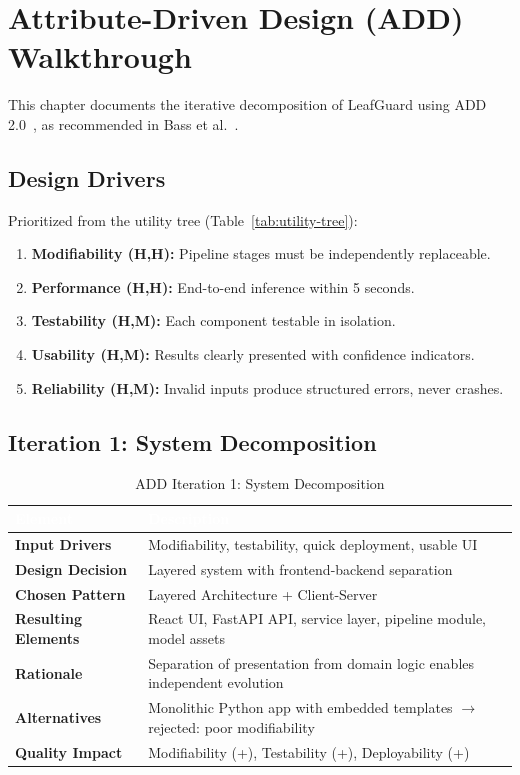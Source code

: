 \documentclass[11pt,a4paper,oneside]{report}
\begin{document}
\chapter{Attribute-Driven Design (ADD) Walkthrough}

This chapter documents the iterative decomposition of LeafGuard using ADD 2.0~\cite{wojcik2006}, as recommended in Bass et al.~\cite{bass2024}.

\section{Design Drivers}

Prioritized from the utility tree (Table~\ref{tab:utility-tree}):
\begin{enumerate}
  \item \textbf{Modifiability (H,H):} Pipeline stages must be independently replaceable.
  \item \textbf{Performance (H,H):} End-to-end inference within 5 seconds.
  \item \textbf{Testability (H,M):} Each component testable in isolation.
  \item \textbf{Usability (H,M):} Results clearly presented with confidence indicators.
  \item \textbf{Reliability (H,M):} Invalid inputs produce structured errors, never crashes.
\end{enumerate}

\section{Iteration 1: System Decomposition}

\begin{table}[H]
\centering\footnotesize
\caption{ADD Iteration 1: System Decomposition}
\label{tab:add-iter1}
\begin{tabularx}{\textwidth}{>{\bfseries}p{2.8cm} X}
\toprule
\rowcolor{tableheader}
\textcolor{white}{Element} & \textcolor{white}{Description} \\
\midrule
Input Drivers     & Modifiability, testability, quick deployment, usable UI \\
Design Decision   & Layered system with frontend-backend separation \\
Chosen Pattern    & Layered Architecture + Client-Server \\
Resulting Elements & React UI, FastAPI API, service layer, pipeline module, model assets \\
Rationale         & Separation of presentation from domain logic enables independent evolution \\
Alternatives      & Monolithic Python app with embedded templates $\to$ rejected: poor modifiability \\
Quality Impact    & Modifiability (+), Testability (+), Deployability (+) \\
\bottomrule
\end{tabularx}
\end{table}
\end{document}
